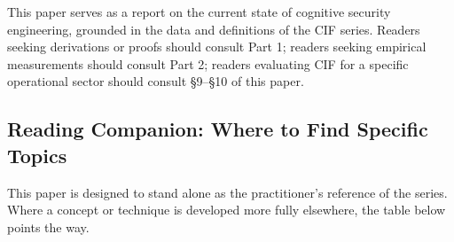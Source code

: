 \documentclass[
]{article}
\begin{document}
This paper serves as a report on the current state of cognitive security
engineering, grounded in the data and definitions of the CIF series.
Readers seeking derivations or proofs should consult Part 1; readers
seeking empirical measurements should consult Part 2; readers evaluating
CIF for a specific operational sector should consult §9--§10 of this
paper.

\subsection{Reading Companion: Where to Find Specific
Topics}\label{sec:reading-companion}

This paper is designed to stand alone as the practitioner's reference of
the series. Where a concept or technique is developed more fully
elsewhere, the table below points the way.
\end{document}
